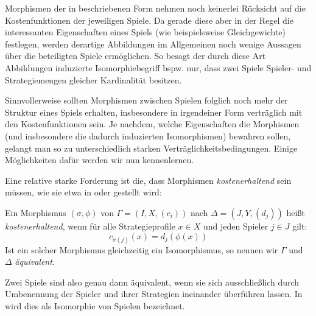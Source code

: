 Morphismen der in  beschriebenen Form nehmen noch keinerlei Rücksicht auf die Kostenfunktionen der jeweiligen Spiele. Da gerade diese aber in der Regel die interessanten Eigenschaften eines Spiels (wie beispielsweise Gleichgewichte) festlegen, werden derartige Abbildungen im Allgemeinen noch wenige Aussagen über die beteiligten Spiele ermöglichen. So besagt der durch diese Art Abbildungen induzierte Isomorphiebegriff bspw. nur, dass zwei Spiele Spieler- und Strategiemengen gleicher Kardinalität besitzen.

Sinnvollerweise sollten Morphismen zwischen Spielen folglich noch mehr der Struktur eines Spiels erhalten, insbesondere in irgendeiner Form \glqq verträglich\grqq{} mit den Kostenfunktionen sein. Je nachdem, welche Eigenschaften die Morphismen (und insbesondere die dadurch induzierten Isomorphismen) bewahren sollen, gelangt man so zu unterschiedlich starken Verträglichkeitsbedingungen. Einige Möglichkeiten dafür werden wir nun kennenlernen.

Eine relative starke Forderung ist die, dass Morphismen \emph{kostenerhaltend} sein müssen, wie sie etwa in \cite[S. 288f]{Nash} oder \cite[Abschnitt 2.1]{ReprOfFiniteGamesAsNCG} gestellt wird:

\begin{defn}
	Ein Morphismus $(\sigma, \phi)$ von $\Gamma = (I, X, (c_i))$ nach $\Delta = (J, Y, (d_j))$ heißt \emph{kostenerhaltend}, wenn für alle Strategieprofile $x \in X$ und jeden Spieler $j \in J$ gilt:
		\[c_{\sigma(j)}(x) = d_j(\phi(x)) \]
	Ist ein solcher Morphismus gleichzeitig ein Isomorphismus, so nennen wir $\Gamma$ und $\Delta$ \emph{äquivalent}.
\end{defn}

\begin{bem}
	Zwei Spiele sind also genau dann äquivalent, wenn sie sich ausschließlich durch Umbenennung der Spieler und ihrer Strategien ineinander überführen lassen. In \cite[S. 133]{MonShap} wird dies als Isomorphie von Spielen bezeichnet.
\end{bem}

